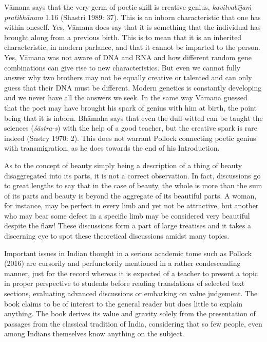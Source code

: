 Vāmana says that the very germ of poetic skill is creative genius, \textit{kavitvabījaṁ pratibhānam }1.16 (Shastri 1989: 37). This is an inborn characteristic that one has within oneself. Yes, Vāmana does say that it is something that the individual has brought along from a previous birth. This is to mean that it is an inherited characteristic, in modern parlance, and that it cannot be imparted to the person. Yes, Vāmana was not aware of DNA and RNA and how different random gene combinations can give rise to new characteristics. But even we cannot fully answer why two brothers may not be equally creative or talented and can only guess that their DNA must be different. Modern genetics is constantly developing and we never have all the answers we seek. In the same way Vāmana guessed that the poet may have brought his spark of genius with him at birth, the point being that it is inborn. Bhāmaha says that even the dull-witted can be taught the sciences (\textit{śāstra-s}) with the help of a good teacher, but the creative spark is rare indeed (Sastry 1970: 2). This does not warrant Pollock connecting poetic genius with transmigration, as he does towards the end of his Introduction.

As to the concept of beauty simply being a description of a thing of beauty disaggregated into its parts, it is not a correct observation. In fact, discussions go to great lengths to say that in the case of beauty, the whole is more than the sum of its parts and beauty is beyond the aggregate of its beautiful parts. A woman, for instance, may be perfect in every limb and yet not be attractive, but another who may bear some defect in a specific limb may be considered very beautiful despite the flaw! These discussions form a part of large treatises and it takes a discerning eye to spot these theoretical discussions amidst many topics.

Important issues in Indian thought in a serious academic tome such as Pollock (2016) are cursorily and perfunctorily mentioned in a rather condescending manner, just for the record whereas it is expected of a teacher to present a topic in proper perspective to students before reading translations of selected text sections, evaluating advanced discussions or embarking on value judgement. The book claims to be of interest to the general reader but does little to explain anything. The book derives its value and gravity solely from the presentation of passages from the classical tradition of India, considering that so few people, even among Indians themselves know anything on the subject.

